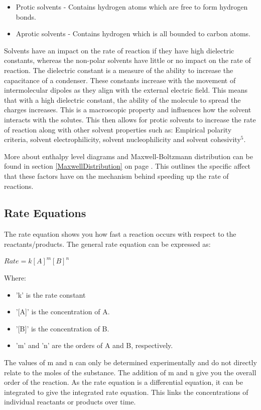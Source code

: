 \begin{itemize}
\item Protic solvents - Contains hydrogen atoms which are free to form hydrogen bonds.
\item Aprotic solvents - Contains hydrogen which is all bounded to carbon atoms.
\end{itemize}

Solvents have an impact on the  rate of reaction if they have high dielectric constants, whereas the non-polar solvents have little or no impact on the rate of reaction. The dielectric constant is a measure of the ability to increase the capacitance of a condenser. These constants increase with the movement of intermolecular dipoles as they align with the external electric field. This means that with a high dielectric constant, the ability of the molecule to spread the charges increases. This is a macroscopic property and influences how the solvent interacts with the solutes. This then allows for protic solvents to increase the rate of reaction along with other solvent properties such as: Empirical polarity criteria, solvent electrophilicity, solvent nucleophilicity and solvent cohesivity$^5$.

More about enthalpy level diagrams and Maxwell-Boltzmann distribution can be found in section \ref{MaxwellDistribution} on page \pageref{MaxwellDistribution}. This outlines the specific affect that these factors have on the mechanism behind speeding up the rate of reactions. 

	\subsection{Rate Equations} 

The rate equation shows you how fast a reaction occurs with respect to the reactants/products. The general rate equation can be expressed as:

$Rate = k[A]^m [B]^n$

Where:
\begin{itemize}
\item 'k' is the rate constant
\item '[A]' is the concentration of A.
\item '[B]' is the concentration of B.
\item 'm' and 'n' are the orders of A and B, respectively.
\end{itemize}


The values of m and n can only be determined experimentally and do not directly relate to the moles of the substance. The addition of m and n give you the overall order of the reaction. As the rate equation is a differential equation, it can be integrated to give the integrated rate equation. This links the concentrations of individual reactants or products over time. 

